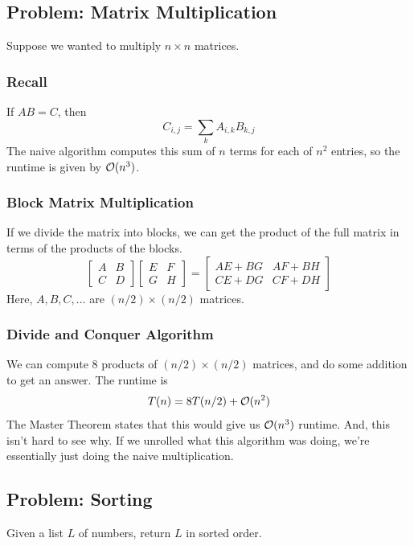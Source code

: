 \documentclass[letterpaper]{article}
\begin{document}
\subsection{Problem: Matrix Multiplication}
Suppose we wanted to multiply $n \times n$ matrices.

\subsubsection{Recall}
If $AB = C$, then 
\[C_{i, j} = \sum_{k} A_{i, k} B_{k, j}\]
The naive algorithm computes this sum of $n$ terms for each of $n^2$ entries, so the runtime is given by $\mathcal{O}(n^3)$.

\subsubsection{Block Matrix Multiplication}
If we divide the matrix into blocks, we can get the product of the full matrix in terms of the products of the blocks. 
\[
    \begin{bmatrix}
        A & B \\ C & D
    \end{bmatrix} \begin{bmatrix}
        E & F \\ G & H
    \end{bmatrix} = \begin{bmatrix}
        AE + BG & AF + BH \\ 
        CE + DG & CF + DH 
    \end{bmatrix}
\]
Here, $A, B, C, \dots$ are $(n / 2) \times (n / 2)$ matrices. 

\subsubsection{Divide and Conquer Algorithm}
We can compute 8 products of $(n / 2) \times (n / 2)$ matrices, and do some addition to get an answer. The runtime is 
\[T(n) = 8T(n / 2) + \mathcal{O}(n^2)\]
The Master Theorem states that this would give us $\mathcal{O}(n^3)$ runtime. And, this isn't hard to see why. If we unrolled what this algorithm was doing, we're essentially just doing the naive multiplication.



\subsection{Problem: Sorting}
Given a list $L$ of numbers, return $L$ in sorted order.
\end{document}

